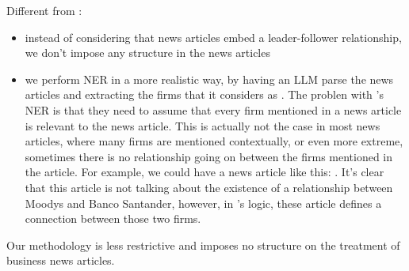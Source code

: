 
Different from \cite{hu2021networks}: 
\begin{itemize}
  \item instead of considering that news articles embed a leader-follower relationship, we don't impose any structure in the news articles
  \item we perform NER in a more realistic way, by having an LLM parse the news articles and extracting the firms that it considers as . The problen with \cite{hu2021networks}'s NER is that they need to assume that every firm mentioned in a news article is relevant to the news article. This is actually not the case in most news articles, where many firms are mentioned contextually, or even more extreme, sometimes there is no relationship going on between the firms mentioned in the article. For example, we could have a news article like this: . It's clear that this article is not talking about the existence of a relationship between Moodys and Banco Santander, however, in \cite{hu2021networks}'s logic, these article defines a connection between those two firms.
\end{itemize}

Our methodology is less restrictive and imposes no structure on the treatment of business news articles. 



